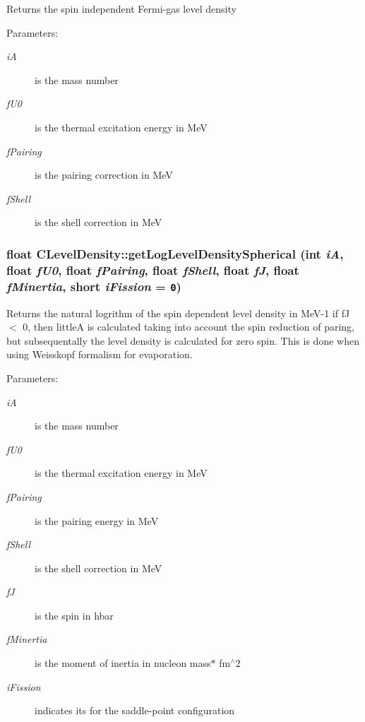 Returns the spin independent Fermi-gas level density \begin{Desc}
\item[Parameters:]
\begin{description}
\item[{\em i\-A}]is the mass number \item[{\em f\-U0}]is the thermal excitation energy in Me\-V \item[{\em f\-Pairing}]is the pairing correction in Me\-V \item[{\em f\-Shell}]is the shell correction in Me\-V \end{description}
\end{Desc}
\subsubsection{\setlength{\rightskip}{0pt plus 5cm}float CLevel\-Density::get\-Log\-Level\-Density\-Spherical (int {\em i\-A}, float {\em f\-U0}, float {\em f\-Pairing}, float {\em f\-Shell}, float {\em f\-J}, float {\em f\-Minertia}, short {\em i\-Fission} = {\tt 0})}\label{classCLevelDensity_4bac625039f18d6d02c6a72070ae3ff3}


Returns the natural logrithm of the spin dependent level density in Me\-V-1 if f\-J $<$ 0, then little\-A is calculated taking into account the spin reduction of paring, but subsequentally the level density is calculated for zero spin. This is done when using Weisskopf formalism for evaporation. \begin{Desc}
\item[Parameters:]
\begin{description}
\item[{\em i\-A}]is the mass number \item[{\em f\-U0}]is the thermal excitation energy in Me\-V \item[{\em f\-Pairing}]is the pairing energy in Me\-V \item[{\em f\-Shell}]is the shell correction in Me\-V \item[{\em f\-J}]is the spin in hbar \item[{\em f\-Minertia}]is the moment of inertia in nucleon mass$\ast$ fm$^\wedge$2 \item[{\em i\-Fission}]indicates its for the saddle-point configuration \end{description}
\end{Desc}
